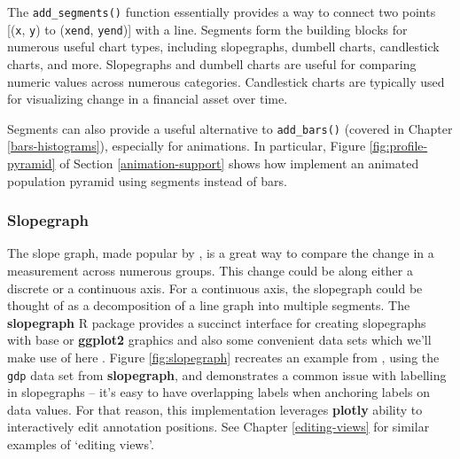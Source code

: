 \documentclass[
  12pt,
]{krantz}
\begin{document}
The \texttt{add\_segments()} function essentially provides a way to connect two points {[}(\texttt{x}, \texttt{y}) to (\texttt{xend}, \texttt{yend}){]} with a line. Segments form the building blocks for numerous useful chart types, including slopegraphs, dumbell charts, candlestick charts, and more. Slopegraphs and dumbell charts are useful for comparing numeric values across numerous categories. Candlestick charts are typically used for visualizing change in a financial asset over time.

Segments can also provide a useful alternative to \texttt{add\_bars()} (covered in Chapter \ref{bars-histograms}), especially for animations. In particular, Figure \ref{fig:profile-pyramid} of Section \ref{animation-support} shows how implement an animated population pyramid using segments instead of bars.

\hypertarget{slopegraph}{%
\subsubsection{Slopegraph}\label{slopegraph}}


The slope graph, made popular by \citet{tufte2001}, is a great way to compare the change in a measurement across numerous groups. This change could be along either a discrete or a continuous axis. For a continuous axis, the slopegraph could be thought of as a decomposition of a line graph into multiple segments. The \textbf{slopegraph} R package provides a succinct interface for creating slopegraphs with base or \textbf{ggplot2} graphics and also some convenient data sets which we'll make use of here \citep{slopegraph}. Figure \ref{fig:slopegraph} recreates an example from \citet{tufte2001}, using the \texttt{gdp} data set from \textbf{slopegraph}, and demonstrates a common issue with labelling in slopegraphs -- it's easy to have overlapping labels when anchoring labels on data values. For that reason, this implementation leverages \textbf{plotly} ability to interactively edit annotation positions. See Chapter \ref{editing-views} for similar examples of `editing views'.
\end{document}
